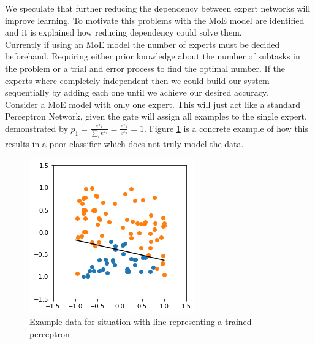 \documentclass[notitlepage]{report}
\theoremstyle{definition}
\begin{document}
We speculate that further reducing the dependency between expert networks will improve learning. To motivate this problems with the MoE model are identified and it is explained how reducing dependency could solve them.\\ 

Currently if using an MoE model the number of experts must be decided beforehand. Requiring either prior knowledge about the number of subtasks in the problem or a trial and error process to find the optimal number. If the experts where completely independent then we could build our system sequentially by adding each one until we achieve our desired accuracy.\\

Consider a MoE model with only one expert. This will just act like a standard Perceptron Network, given the gate will assign all examples to the single expert, demonstrated by $p_1 = \frac{e^{x_1}}{\sum_i e^{x_i}} = \frac{e^{x_1}}{e^{x_1}} = 1$. Figure \ref{fig:intro-concrete-example} is a concrete example of how this results in a poor classifier which does not truly model the data. 

\begin{figure}[H]
	\centering
	\begin{minipage}[b]{0.5\textwidth}
		\includegraphics[width=\textwidth]{Standard-Perceptron.png}
		\caption{Example data for situation with line representing a trained perceptron}
		\label{fig:intro-concrete-example}
	\end{minipage}
	\hfill
\end{figure}
\end{document}

